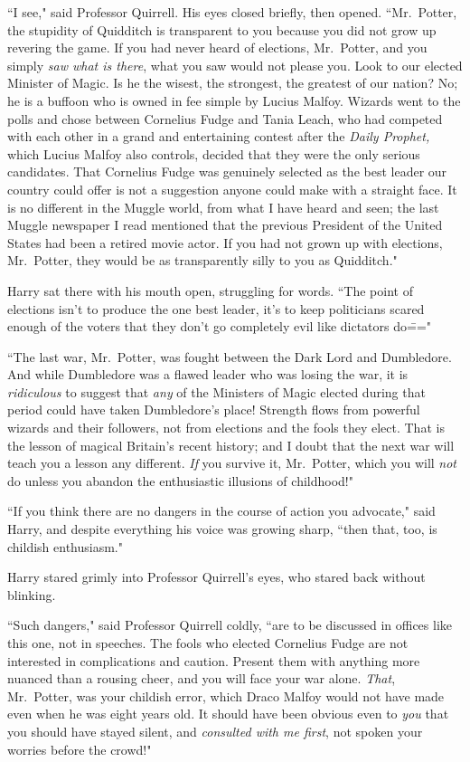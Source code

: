 ``I see," said Professor Quirrell. His eyes closed briefly, then opened. ``Mr.~Potter, the stupidity of Quidditch is transparent to you because you did not grow up revering the game. If you had never heard of elections, Mr.~Potter, and you simply \emph{saw what is there}, what you saw would not please you. Look to our elected Minister of Magic. Is he the wisest, the strongest, the greatest of our nation? No; he is a buffoon who is owned in fee simple by Lucius Malfoy. Wizards went to the polls and chose between Cornelius Fudge and Tania Leach, who had competed with each other in a grand and entertaining contest after the \emph{Daily Prophet,} which Lucius Malfoy also controls, decided that they were the only serious candidates. That Cornelius Fudge was genuinely selected as the best leader our country could offer is not a suggestion anyone could make with a straight face. It is no different in the Muggle world, from what I have heard and seen; the last Muggle newspaper I read mentioned that the previous President of the United States had been a retired movie actor. If you had not grown up with elections, Mr.~Potter, they would be as transparently silly to you as Quidditch."

Harry sat there with his mouth open, struggling for words. ``The point of elections isn't to produce the one best leader, it's to keep politicians scared enough of the voters that they don't go completely evil like dictators do\==="

``The last war, Mr.~Potter, was fought between the Dark Lord and Dumbledore. And while Dumbledore was a flawed leader who was losing the war, it is \emph{ridiculous} to suggest that \emph{any} of the Ministers of Magic elected during that period could have taken Dumbledore's place! Strength flows from powerful wizards and their followers, not from elections and the fools they elect. That is the lesson of magical Britain's recent history; and I doubt that the next war will teach you a lesson any different. \emph{If} you survive it, Mr.~Potter, which you will \emph{not} do unless you abandon the enthusiastic illusions of childhood!"

``If you think there are no dangers in the course of action you advocate," said Harry, and despite everything his voice was growing sharp, ``then that, too, is childish enthusiasm."

Harry stared grimly into Professor Quirrell's eyes, who stared back without blinking.

``Such dangers," said Professor Quirrell coldly, ``are to be discussed in offices like this one, not in speeches. The fools who elected Cornelius Fudge are not interested in complications and caution. Present them with anything more nuanced than a rousing cheer, and you will face your war alone. \emph{That}, Mr.~Potter, was your childish error, which Draco Malfoy would not have made even when he was eight years old. It should have been obvious even to \emph{you} that you should have stayed silent, and \emph{consulted with me first}, not spoken your worries before the crowd!"

